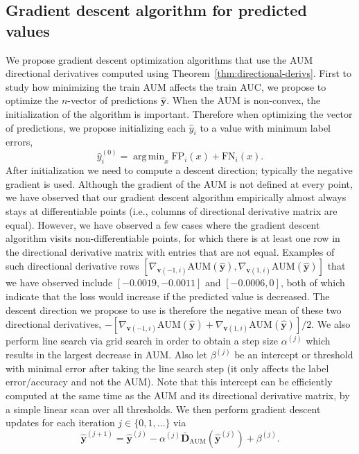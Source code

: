 \documentclass{article}
\DeclareMathOperator*{\argmin}{arg\, min}
\begin{document}
\subsection{Gradient descent algorithm for predicted values}
\label{sec:gradient-descent}

We propose gradient descent optimization algorithms that use the AUM directional derivatives computed using Theorem~\ref{thm:directional-derivs}.
First to study how minimizing the train AUM affects the train AUC, we propose to optimize the $n$-vector of predictions $\mathbf{\hat{y}}$.
When the AUM is non-convex, the initialization of the algorithm is important. Therefore when optimizing the vector of predictions, we propose initializing each $\hat y_i$ to a value with minimum label errors, 
\begin{equation}
    \hat y_i^{(0)} = \argmin_x 
    \text{FP}_i(x) + 
    \text{FN}_i(x).
\end{equation}
After initialization we need to compute a descent direction; typically the negative gradient is used.
Although the gradient of the AUM is not defined at every point, we have observed that our gradient descent algorithm empirically almost always stays at differentiable points (i.e., columns of directional derivative matrix are equal).
However, we have observed a few cases where the gradient descent algorithm visits non-differentiable points, for which there is at least one row in the directional derivative matrix with entries that are not equal. 
Examples of such directional derivative rows $[\nabla_{\mathbf v(-1,i)}\text{AUM}(\mathbf{\hat{y}}),\nabla_{\mathbf v(1,i)}\text{AUM}(\mathbf{\hat{y}})]$ that we have observed include $[-0.0019, -0.0011]$ and $[-0.0006, 0]$, both of which indicate that the loss would increase if the predicted value is decreased. 
The descent direction we propose to use is therefore the negative mean of these two directional derivatives, $-[\nabla_{\mathbf v(-1,i)}\text{AUM}(\mathbf{\hat{y}})+\nabla_{\mathbf v(1,i)}\text{AUM}(\mathbf{\hat{y}})]/2$.
We also perform line search via grid search in order to obtain a step size $\alpha^{(j)}$ which results in the largest decrease in AUM.
Also let $\beta^{(j)}$ be an intercept or threshold with minimal error after taking the line search step (it only affects the label error/accuracy and not the AUM).
Note that this intercept can be efficiently computed at the same time as the AUM and its directional derivative matrix, by a simple linear scan over all thresholds.
We then perform gradient descent updates for each iteration $j\in\{0,1,\dots\}$ via
\begin{equation}
    \mathbf{\hat y}^{(j+1)} = \mathbf{\hat y}^{(j)} - \alpha^{(j)} \mathbf {\bar D}_\text{AUM}(\mathbf {\hat y}^{(j)}) + \beta^{(j)}.
\end{equation}
\end{document}
